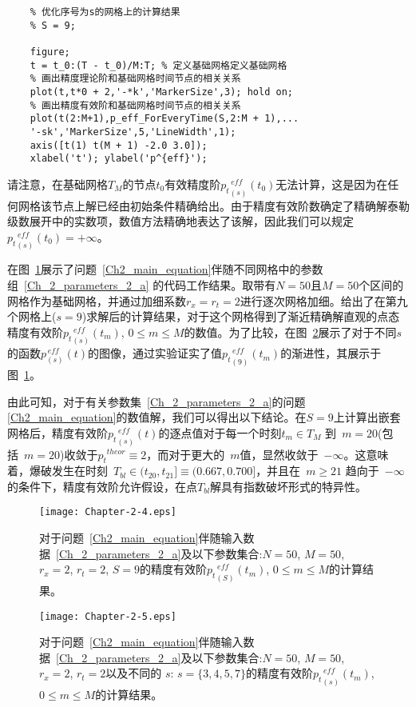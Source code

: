 \documentclass[twoside]{book}
\begin{document}
\begin{CJK*}{GBK}{song}
\begin{lstlisting}
	% 优化序号为s的网格上的计算结果
	% S = 9;
	
	figure;
	t = t_0:(T - t_0)/M:T; % 定义基础网格定义基础网格
	% 画出精度理论阶和基础网格时间节点的相关关系
	plot(t,t*0 + 2,'-*k','MarkerSize',3); hold on;
	% 画出精度有效阶和基础网格时间节点的相关关系
	plot(t(2:M+1),p_eff_ForEveryTime(S,2:M + 1),...
	'-sk','MarkerSize',5,'LineWidth',1);
	axis([t(1) t(M + 1) -2.0 3.0]);
	xlabel('t'); ylabel('p^{eff}');
	\end{lstlisting}
	
	请注意，在基础网格$T_M$的节点$t_0$有效精度阶${p_t}_{(s)}^{\, eff}(t_0)$无法计算，这是因为在任何网格该节点上解已经由初始条件精确给出。由于精度有效阶数确定了精确解泰勒级数展开中的实数项，数值方法精确地表达了该解，因此我们可以规定~${p_t}_{(s)}^{\, eff}(t_0)=+\infty$。
	
	在图~\ref{Fig_2_4}展示了问题~\eqref{Ch2_main_equation}伴随不同网格中的参数组~\eqref{Ch_2_parameters_2_a} 的代码工作结果。取带有$N = 50$且$M = 50$个区间的网格作为基础网格，并通过加细系数$r_x = r_t = 2$进行逐次网格加细。给出了在第九个网格上($s = 9$)求解后的计算结果，对于这个网格得到了渐近精确解直观的点态精度有效阶${p_t}^{\, eff}_{(s)}(t_m)$, $0 \leqslant m \leqslant M$的数值。为了比较，在图~\ref{Fig_2_5}展示了对于不同$s$的函数$p^{\, eff}_{(s)}(t)$的图像，通过实验证实了值${p_t}^{\, eff}_{(9)}(t_m)$的渐进性，其展示于图~\ref{Fig_2_4}。

	由此可知，对于有关参数集~\eqref{Ch_2_parameters_2_a}的问题\eqref{Ch2_main_equation}的数值解，我们可以得出以下结论。在$S = 9$上计算出嵌套网格后，精度有效阶${p_t}^{\, eff}_{(s)}(t)$的逐点值对于每一个时刻$t_m \in T_M$ 到~$m=20$(包括~$m=20$)收敛于${p_t}^{theor} \equiv 2$，而对于更大的~$m$值，显然收敛于~$-\infty$。这意味着，爆破发生在时刻~$T_{bl} \in (t_{20},t_{21}] \equiv (0.667,0.700]$，并且在~$m\geqslant21$ 趋向于~$-\infty$的条件下，精度有效阶允许假设，在点$T_{bl}$解具有指数破坏形式的特异性。
	
	\begin{figure}[t]
		\centering
		\texttt{[image: Chapter-2-4.eps]}\\
		\caption{对于问题~\eqref{Ch2_main_equation}伴随输入数据~\eqref{Ch_2_parameters_2_a}及以下参数集合:$N = 50$, $M = 50$, $r_x = 2$, $r_t = 2$, $S = 9$的精度有效阶${p_t}^{\, eff}_{(S)}(t_m)$, $0 \leqslant m \leqslant M$的计算结果。}
		\label{Fig_2_4}
	\end{figure}
	
	\begin{figure}[h!]
		\centering
		\texttt{[image: Chapter-2-5.eps]}\\
		\caption{对于问题~\eqref{Ch2_main_equation}伴随输入数据~\eqref{Ch_2_parameters_2_a}及以下参数集合:$N = 50$, $M = 50$, $r_x = 2$, $r_t = 2$以及不同的 $s$: $s = \{3,4,5,7\}$的精度有效阶${p_t}^{\, eff}_{(s)}(t_m)$, $0 \leqslant m \leqslant M$的计算结果。}
		\label{Fig_2_5}
	\end{figure}
	

\end{CJK*}
\end{document}

